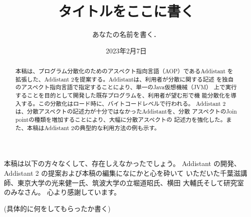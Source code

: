 \documentclass[12pt,twoside]{jbook}
\begin{document}
\title{%
  タイトルをここに書く
}


\author{%
  あなたの名前を書く．
}

\date{2023年2月7日}



\stnumber{}



\maketitle


\begin{abstract}
本稿は、プログラム分散化のためのアスペクト指向言語（AOP）であるAddistant%
を拡張した、Addistant 2を提案する。Addistantは、利用者が分散に関する記述
を独自のアスペクト指向言語で指定することにより、単一のJava仮想機械（JVM）
上で実行することを目的として開発した既存プログラムを、利用者が望む形で機
能分散化を導入する。この分散化はロード時に、バイトコードレベルで行われる。
Addistant 2は、分散アスペクトの記述力が十分ではなかったAddistantを、分散
アスペクトのJoin pointの種類を増加することにより、大幅に分散アスペクトの
記述力を強化した。また、本稿はAddistant 2の典型的な利用方法の例も示す。
\end{abstract}

\begin{acknowledgments}
本稿は以下の方々なくして、存在しえなかったでしょう。
Addistant の開発、Addistant 2 の提案および本稿の編集になにかと心を砕いて
いただいた千葉滋講師、東京大学の光来健一氏、筑波大学の立堀道昭氏、横田
大輔氏そして研究室のみなさん。
心より感謝しています。

(具体的に何をしてもらったか書く)

\end{acknowledgments}
\end{document}
